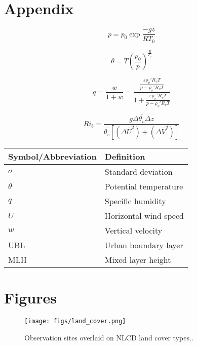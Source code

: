 \documentclass[11pt,a4paper]{article}
\begin{document}
\printbibliography

\section*{Appendix}

\begin{equation*}\label{eqn:pressure}
	p = p_0 \exp{\frac{-g z}{R T_0}}
\end{equation*}

\begin{equation*}\label{eqn:potential_temperature}
	\theta = T \left(\frac{p_0}{p} \right)^{\frac{R}{c_p}}
\end{equation*}

\begin{equation*}\label{eqn:specific_humidity}
	q = \frac{w}{1+w} = \frac{\frac{\varepsilon \rho_v' R_v T}{p - \rho_v' R_v T}}{1+\frac{\varepsilon \rho_v' R_v T}{p - \rho_v' R_v T}} 
\end{equation*}

\begin{equation*}
	Ri_b = \frac{g \Delta \bar{\theta_v} \Delta z}{\bar{\theta_v} \left[ (\Delta \bar{U}^2) + (\Delta \bar{V}^2) \right] }
\end{equation*}

\label{tab:symbols}
\begin{center}
	\begin{tabularx}{0.5\textwidth}{l X}
 		\hline
 		Symbol/Abbreviation & Definition \\
 		\hline
 		$\sigma$ & Standard deviation \\
 		$\theta$ & Potential temperature \\
 		$q$ & Specific humidity \\
 		$U$ & Horizontal wind speed \\
 		$w$ & Vertical velocity \\
 		UBL & Urban boundary layer \\
 		MLH & Mixed layer height \\
 		\hline
	\end{tabularx}
\end{center}

\section*{Figures}

\begin{figure}[ht]
	\centering
	\texttt{[image: figs/land\_cover.png]}
	\caption{Observation sites overlaid on NLCD land cover types..}
	\label{fig:land_cover}
\end{figure}
 
\end{document}
